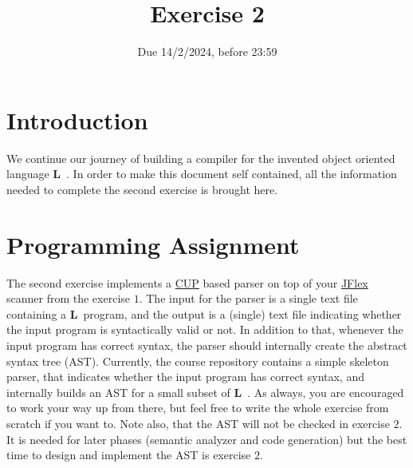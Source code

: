 \documentclass{article}
\begin{document}
\title{Exercise 2}


\date{Due 14/2/2024, before 23:59}

\maketitle

\newcommand{\plname}{\textbf{L}\ }

\section{Introduction}
We continue our journey of building a compiler
for the invented object oriented language \plname.
In order to make this document self contained,
all the information needed to complete the second exercise is brought here.
\section{Programming Assignment}
The second exercise implements a \href{http://www2.cs.tum.edu/projects/cup/}{CUP} based
parser on top of your \href{http://jflex.de/}{JFlex} scanner from the exercise $1$.
The input for the parser is a single text file containing a \plname program,
and the output is a (single) text file indicating whether the input program
is syntactically valid or not. In addition to that,
whenever the input program has correct syntax,
the parser should internally create the abstract syntax tree (AST).
Currently, the course repository contains a simple skeleton
parser, that indicates whether the input program has correct syntax,
and internally builds an AST for a small subset of \plname.
As always, you are encouraged to work your way up from there,
but feel free to write the whole exercise from scratch if you want to.
Note also, that the AST will not be checked in exercise $2$.
It is needed for later phases (semantic analyzer and code generation)
but the best time to design and implement the AST is exercise $2$.
\end{document}
